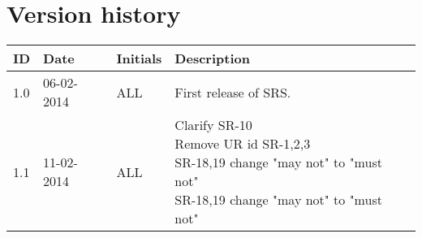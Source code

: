 \documentclass[Main]{subfiles}
\begin{document}
\section*{Version history}

\begin{tabular}{p{} p{} p{} p{}}
\hline
\textbf{ID} & \textbf{Date} & \textbf{Initials} & \textbf{Description}
\\
\hline
1.0 & 06-02-2014 & ALL & First release of SRS.
\\ 
1.1 & 11-02-2014 & ALL & \parbox[t]{0.7\textwidth}{
Clarify SR-10
\\ Remove UR id SR-1,2,3
\\ SR-18,19 change "may not" to "must not"
\\ SR-18,19 change "may not" to "must not"
\\
}
\\ \hline 
\end{tabular} 
\end{document}
